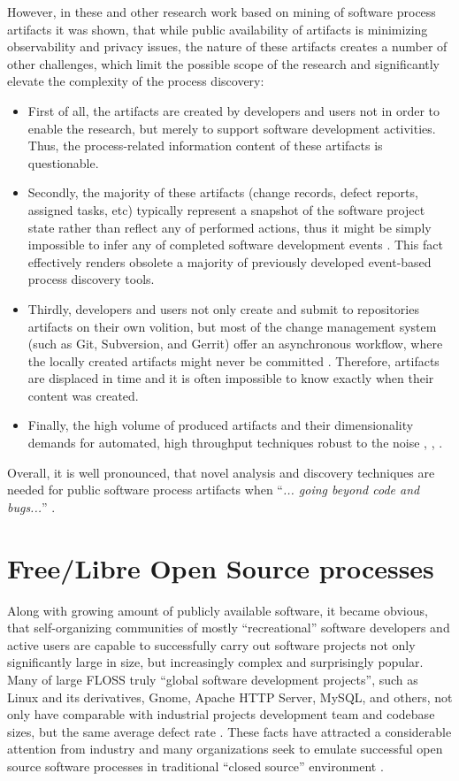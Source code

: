 However, in these and other research work based on mining of software process artifacts it was shown, 
that while public availability of artifacts is minimizing observability and privacy issues, the nature 
of these artifacts creates a number of other challenges, which limit the possible scope of the research 
and significantly elevate the complexity of the process discovery:
\begin{itemize}
\item First of all, the artifacts are created by developers and users not in order to enable the research,
but merely to support software development activities. Thus, the process-related information content of these
artifacts is questionable.
\item Secondly, the majority of these artifacts (change records, defect reports, assigned tasks, etc) 
typically represent a snapshot of the software project state rather than reflect any of performed actions, 
thus it might be simply impossible to infer any of completed software development events \cite{citeulike:1296888}.
This fact effectively renders obsolete a majority of previously developed event-based process discovery tools.
\item Thirdly, developers and users not only create and submit to repositories artifacts on their own volition,
but most of the change management system (such as Git, Subversion, and Gerrit) offer an asynchronous workflow, 
where the locally created artifacts might never be committed \cite{citeulike:2280690} \cite{citeulike:9037939}. 
Therefore, artifacts are displaced in time and it is often impossible to know exactly when their content was created.
\item Finally, the high volume of produced artifacts and their dimensionality demands for automated, high throughput 
techniques robust to the noise \cite{citeulike:12550438}, \cite{citeulike:7853299}, \cite{citeulike:4534888}.
\end{itemize}
Overall, it is well pronounced, that novel analysis and discovery techniques are needed for public software process
artifacts when ``\textit{... going beyond code and bugs...}'' \cite{citeulike:7853299}.

\section{Free/Libre Open Source processes}
Along with growing amount of publicly available software, it became obvious, that self-organizing communities of 
mostly ``recreational'' software developers and active users are capable to successfully carry out software projects 
not only significantly large in size, but increasingly complex and surprisingly popular.
Many of large FLOSS truly ``global software development projects'', such as Linux and its derivatives, 
Gnome, Apache HTTP Server, MySQL, and others, not only have comparable with industrial projects development team 
and codebase sizes, but the same average defect rate \cite{coverity2012}. 
These facts have attracted a considerable attention from industry and many organizations 
seek to emulate successful open source software processes in traditional ``closed source'' environment 
\cite{oss_virtual_organizations} \cite{oss_balance} \cite{oss_hp} \cite{oss_4industry}. 

